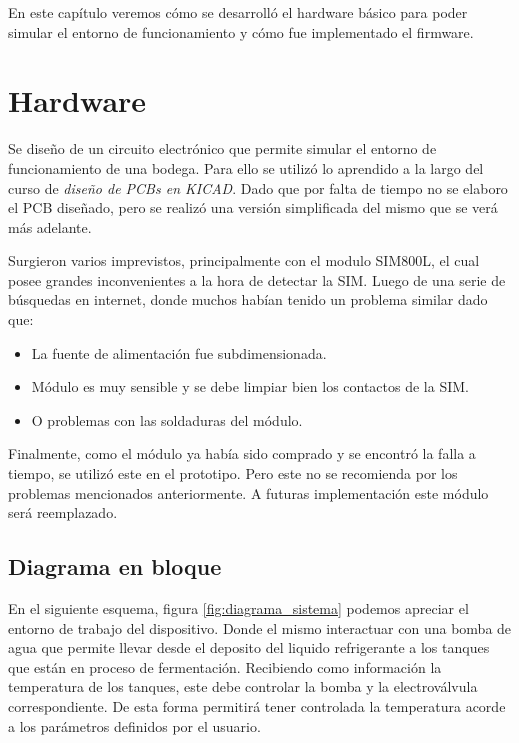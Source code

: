 En este capítulo veremos cómo se desarrolló el hardware básico para poder simular el entorno de funcionamiento y cómo fue implementado el firmware.

\section{Hardware}

Se diseño de un circuito electrónico que permite simular el entorno de funcionamiento de una bodega. Para ello se utilizó lo aprendido a la largo del curso de \emph{diseño de PCBs en KICAD}. Dado que por falta de tiempo no se elaboro el PCB diseñado, pero se realizó una versión simplificada del mismo que se verá más adelante. 

Surgieron varios imprevistos, principalmente con el modulo SIM800L, el cual posee grandes inconvenientes a la hora de detectar la SIM. Luego de una serie de búsquedas en internet, donde muchos habían tenido un problema similar dado que:
\begin{itemize}
  \item La fuente de alimentación fue subdimensionada.
  \item Módulo es muy sensible y se debe limpiar bien los contactos de la SIM.
  \item O problemas con las soldaduras del módulo.
\end{itemize}
Finalmente, como el módulo ya había sido comprado y se encontró la falla a tiempo, se utilizó este en el prototipo.
Pero este no se recomienda por los problemas mencionados anteriormente. A futuras implementación este módulo será reemplazado.


\subsection{Diagrama en bloque}
En el siguiente esquema, figura \ref{fig:diagrama_sistema} podemos apreciar el entorno de trabajo del dispositivo. Donde el mismo   interactuar con una bomba de agua que permite llevar desde el deposito del liquido refrigerante a los tanques que están en proceso de fermentación.
Recibiendo como información la temperatura de los tanques, este debe controlar la bomba y la electroválvula correspondiente. De esta forma permitirá tener controlada la temperatura acorde a los parámetros definidos por el usuario. 


